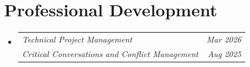 \section{Professional Development}
\vspace{2pt}
\begin{itemize}[leftmargin=0.15in, label={}] 
  \small\item{
    \begin{tabularx}{0.97\textwidth}{@{}X r@{}}
      \textit{Technical Project Management} & {\color{gray}\textit{\small Mar 2026}} \\
      \textit{Critical Conversations and Conflict Management} & {\color{gray}\textit{\small Aug 2025}}
    \end{tabularx}
  }
\end{itemize}
